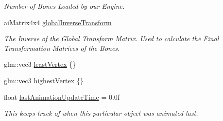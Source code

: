 \begin{DoxyCompactItemize}
\begin{DoxyCompactList}\small\item\em Number of Bones Loaded by our Engine. \end{DoxyCompactList}\item 
ai\+Matrix4x4 \mbox{\hyperlink{classpiolot_1_1_object_a30772cbf9aaab4c5871df82581b8d117}{global\+Inverse\+Transform}}
\begin{DoxyCompactList}\small\item\em The Inverse of the Global Transform Matrix. Used to calculate the Final Transformation Matrices of the Bones. \end{DoxyCompactList}\item 
glm\+::vec3 \mbox{\hyperlink{classpiolot_1_1_object_a44fd0867a8daca738c9b798181e9c48b}{least\+Vertex}} \{\}
\item 
glm\+::vec3 \mbox{\hyperlink{classpiolot_1_1_object_a6862a74fc8184327a0f763578f4a7532}{highest\+Vertex}} \{\}
\item 
float \mbox{\hyperlink{classpiolot_1_1_object_addfd3a255444e86bab978e3e9ee27d37}{last\+Animation\+Update\+Time}} = 0.\+0f
\begin{DoxyCompactList}\small\item\em This keeps track of when this particular object was animated last. \end{DoxyCompactList}\end{DoxyCompactItemize}
